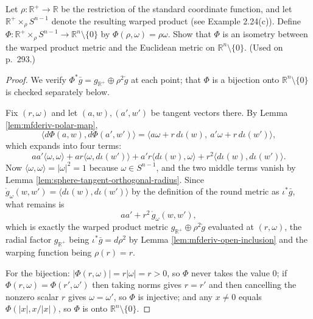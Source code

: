 \begin{exercise}\label{prob:warped-product-isometry}
\leanok
{}
Let $\rho: \mathbb{R}^+ \to \mathbb{R}$ be the restriction of the standard coordinate function, and let $\mathbb{R}^+ \times_\rho S^{n-1}$ denote the resulting warped product (see Example 2.24(c)). Define $\Phi: \mathbb{R}^+ \times_\rho S^{n-1} \to \mathbb{R}^n \setminus \{0\}$ by $\Phi(\rho,\omega) = \rho\omega$. Show that $\Phi$ is an isometry between the warped product metric and the Euclidean metric on $\mathbb{R}^n \setminus \{0\}$. (Used on p.~293.)
\end{exercise}

\begin{proof}
\leanok
{}
We verify $\Phi^*\bar{g} = g_{\mathbb{R}^+} \oplus \rho^2 \mathring{g}$ at each point; that $\Phi$ is a bijection onto $\mathbb{R}^n \setminus \{0\}$ is checked separately below.

Fix $(r,\omega)$ and let $(a,w), (a',w')$ be tangent vectors there. By Lemma \ref{lem:mfderiv-polar-map},
\[
\langle d\Phi(a,w), d\Phi(a',w')\rangle
 = \langle a\omega + r\,d\iota(w),\ a'\omega + r\,d\iota(w')\rangle,
\]
which expands into four terms:
\[
a a' \langle\omega,\omega\rangle + a r \langle \omega, d\iota(w')\rangle + a' r \langle d\iota(w), \omega\rangle + r^2 \langle d\iota(w), d\iota(w')\rangle.
\]
Now $\langle\omega,\omega\rangle = |\omega|^2 = 1$ because $\omega \in S^{n-1}$, and the two middle terms vanish by Lemma \ref{lem:sphere-tangent-orthogonal-radius}. Since $\mathring{g}_\omega(w,w') = \langle d\iota(w), d\iota(w')\rangle$ by the definition of the round metric as $\iota^*\bar{g}$, what remains is
\[
a a' + r^2\,\mathring{g}_\omega(w,w'),
\]
which is exactly the warped product metric $g_{\mathbb{R}^+} \oplus \rho^2\mathring{g}$ evaluated at $(r,\omega)$, the radial factor $g_{\mathbb{R}^+}$ being $\iota^*\bar{g} = d\rho^2$ by Lemma \ref{lem:mfderiv-open-inclusion} and the warping function being $\rho(r) = r$.

For the bijection: $|\Phi(r,\omega)| = r|\omega| = r > 0$, so $\Phi$ never takes the value $0$; if $\Phi(r,\omega) = \Phi(r',\omega')$ then taking norms gives $r = r'$ and then cancelling the nonzero scalar $r$ gives $\omega = \omega'$, so $\Phi$ is injective; and any $x \neq 0$ equals $\Phi(|x|, x/|x|)$, so $\Phi$ is onto $\mathbb{R}^n \setminus \{0\}$.
\end{proof}

